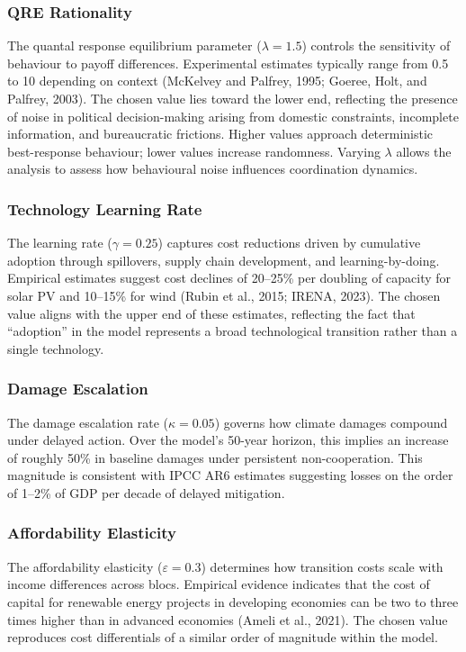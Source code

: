 \documentclass[12pt,a4paper]{article}
\begin{document}
\subsubsection{QRE Rationality}

The quantal response equilibrium parameter ($\lambda = 1.5$) controls the sensitivity of behaviour to payoff differences. Experimental estimates typically range from 0.5 to 10 depending on context (McKelvey and Palfrey, 1995; Goeree, Holt, and Palfrey, 2003). The chosen value lies toward the lower end, reflecting the presence of noise in political decision-making arising from domestic constraints, incomplete information, and bureaucratic frictions. Higher values approach deterministic best-response behaviour; lower values increase randomness. Varying $\lambda$ allows the analysis to assess how behavioural noise influences coordination dynamics.

\subsubsection{Technology Learning Rate}

The learning rate ($\gamma = 0.25$) captures cost reductions driven by cumulative adoption through spillovers, supply chain development, and learning-by-doing. Empirical estimates suggest cost declines of 20--25\% per doubling of capacity for solar PV and 10--15\% for wind (Rubin et al., 2015; IRENA, 2023). The chosen value aligns with the upper end of these estimates, reflecting the fact that ``adoption'' in the model represents a broad technological transition rather than a single technology.

\subsubsection{Damage Escalation}

The damage escalation rate ($\kappa = 0.05$) governs how climate damages compound under delayed action. Over the model's 50-year horizon, this implies an increase of roughly 50\% in baseline damages under persistent non-cooperation. This magnitude is consistent with IPCC AR6 estimates suggesting losses on the order of 1--2\% of GDP per decade of delayed mitigation.

\subsubsection{Affordability Elasticity}

The affordability elasticity ($\varepsilon = 0.3$) determines how transition costs scale with income differences across blocs. Empirical evidence indicates that the cost of capital for renewable energy projects in developing economies can be two to three times higher than in advanced economies (Ameli et al., 2021). The chosen value reproduces cost differentials of a similar order of magnitude within the model.
\end{document}
